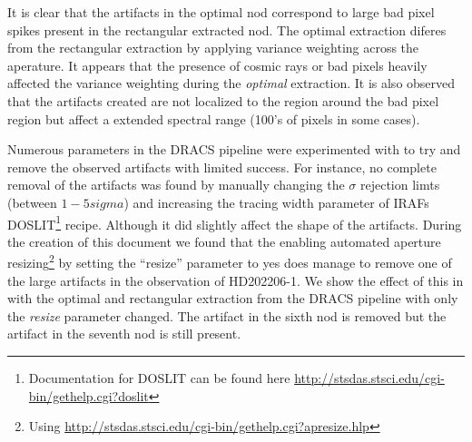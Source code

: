 It is clear that the artifacts in the optimal nod correspond to large bad pixel spikes present in the rectangular extracted nod. The optimal extraction diferes from the rectangular extraction by applying variance weighting across the aperature. It appears that the presence of cosmic rays or bad pixels heavily affected the variance weighting during the \emph{optimal} extraction. It is also observed that the artifacts created are not localized to the region around the bad pixel region but affect a extended spectral range (100's of pixels in some cases). 

Numerous parameters in the DRACS pipeline were experimented with to try and remove the observed artifacts with limited success. For instance, no complete removal of the artifacts was found by manually changing the \(\sigma\) rejection limts (between \(1-5 sigma\)) and increasing the tracing width parameter of IRAFs DOSLIT\footnote{Documentation for DOSLIT can be found here \href{http://stsdas.stsci.edu/cgi-bin/gethelp.cgi?doslit}{http://stsdas.stsci.edu/cgi-bin/gethelp.cgi?doslit}} recipe. Although it did slightly affect the shape of the artifacts. 
During the creation of this document we found that the enabling automated aperture resizing\footnote{Using \href{apresize}{http://stsdas.stsci.edu/cgi-bin/gethelp.cgi?apresize.hlp}} by setting the ``resize'' parameter to yes does manage to remove one of the large artifacts in the observation of {HD202206-1}. We show the effect of this in  with the optimal and rectangular extraction from the DRACS pipeline with only the \emph{resize} parameter changed. The artifact in the sixth nod is removed but the artifact in the seventh nod is still present.
